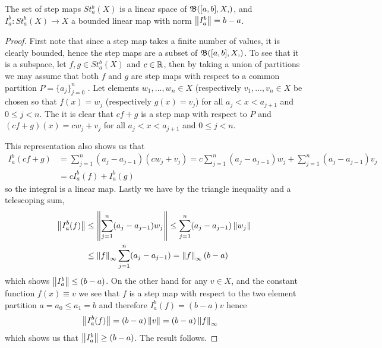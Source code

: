 \begin{prop}\label{banach:IntegralOfStepFunctionsBoundedLinear}The set of step maps $St_a^b(X)$ is a linear space of 
 $\sboundedfunctions{[a,b], X}$,  and $I_a^b : St_a^b(X) \to X$ a bounded linear map with norm $\left \lVert I_a^b \right \rVert = b - a$.
\end{prop}
\begin{proof}
  First note that since a step map takes a finite number of values, it is clearly bounded, hence the step maps are a subset of
  $\sboundedfunctions{[a,b], X}$.  To see that it is a subspace, let $f, g \in St_a^b(X)$ and $c \in \mathbb{R}$, then by taking a union of
  partitions we may assume that both $f$ and $g$ are step maps with respect to a common partition $P=\lbrace a_j \rbrace_{j=0}^n$ .
  Let elements $w_1,  \dotsc, w_n \in X$ (respectively $v_1, \dotsc, v_n \in X$ be chosen so that $f(x) = w_j$ (respectively $g(x) = v_j$)
  for all $a_j < x < a_{j+1}$ and $0 \leq j < n$.  The it is clear that $cf + g$ is a step map with respect to $P$ and $(cf+g)(x) = cw_j + v_j$ 
  for all $a_j < x < a_{j+1}$ and $0 \leq j < n$.

  This representation also shows us that 
  \begin{align*}
    I_a^b(cf + g) &= \sum_{j=1}^n (a_j - a_{j-1}) (cw_j + v_j) = c\sum_{j=1}^n (a_j - a_{j-1}) w_j  + \sum_{j=1}^n (a_j - a_{j-1}) v_j \\
    &= cI_a^b(f) + I_a^b(g)
  \end{align*}
  so the integral is a linear map.  Lastly we have by the triangle inequality and a telescoping sum,
  \begin{align*}
    \left \lVert I_a^b(f) \right \rVert &\leq \left \lVert \sum_{j=1}^n (a_j - a_{j-1}) w_j \right \rVert \leq \sum_{j=1}^n (a_j - a_{j-1}) \left \lVert w_j \right \rVert \\
    &\leq \left \lVert f \right \rVert_\infty \sum_{j=1}^n (a_j - a_{j-1})  = \left \lVert f \right \rVert_\infty (b-a)
  \end{align*}
  which shows $\left \lVert I_a^b \right \rVert \leq (b-a)$.   On the other hand for any $v \in X$, and the constant function $f(x) \equiv v$ we see that $f$
  is a step map with respect to the two element partition $a = a_0 \leq a_1 = b$ and therefore $I_a^b(f) = (b-a) v$ hence
  \begin{align*}
    \left \lVert I_a^b(f) \right \rVert &= (b-a) \left \lVert v \right \rVert  = (b-a) \left \lVert f \right \rVert_\infty
  \end{align*}
  which shows us that $\left \lVert I_a^b \right \rVert \geq (b-a)$.   The result follows.
\end{proof}

